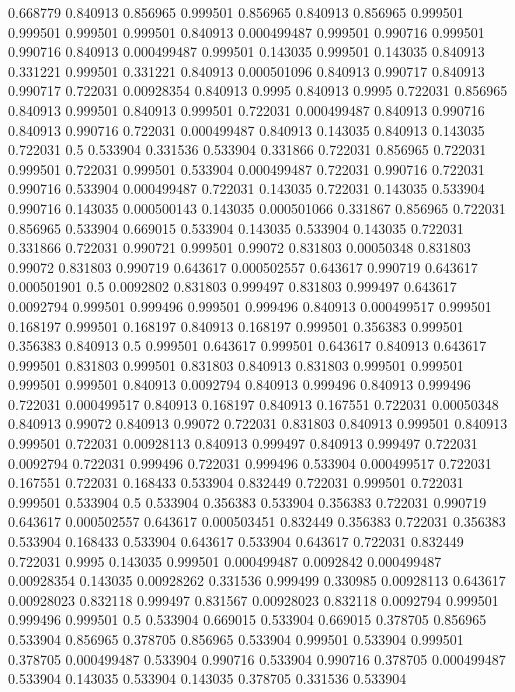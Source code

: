 0.668779 0.840913
0.856965 0.999501
0.856965 0.840913
0.856965 0.999501
0.999501 0.999501
0.999501 0.840913
0.000499487 0.999501
0.990716 0.999501
0.990716 0.840913
0.000499487 0.999501
0.143035 0.999501
0.143035 0.840913
0.331221 0.999501
0.331221 0.840913
0.000501096 0.840913
0.990717 0.840913
0.990717 0.722031
0.00928354 0.840913
0.9995 0.840913
0.9995 0.722031
0.856965 0.840913
0.999501 0.840913
0.999501 0.722031
0.000499487 0.840913
0.990716 0.840913
0.990716 0.722031
0.000499487 0.840913
0.143035 0.840913
0.143035 0.722031
0.5 0.533904
0.331536 0.533904
0.331866 0.722031
0.856965 0.722031
0.999501 0.722031
0.999501 0.533904
0.000499487 0.722031
0.990716 0.722031
0.990716 0.533904
0.000499487 0.722031
0.143035 0.722031
0.143035 0.533904
0.990716 0.143035
0.000500143 0.143035
0.000501066 0.331867
0.856965 0.722031
0.856965 0.533904
0.669015 0.533904
0.143035 0.533904
0.143035 0.722031
0.331866 0.722031
0.990721 0.999501
0.99072 0.831803
0.00050348 0.831803
0.99072 0.831803
0.990719 0.643617
0.000502557 0.643617
0.990719 0.643617
0.000501901 0.5
0.0092802 0.831803
0.999497 0.831803
0.999497 0.643617
0.0092794 0.999501
0.999496 0.999501
0.999496 0.840913
0.000499517 0.999501
0.168197 0.999501
0.168197 0.840913
0.168197 0.999501
0.356383 0.999501
0.356383 0.840913
0.5 0.999501
0.643617 0.999501
0.643617 0.840913
0.643617 0.999501
0.831803 0.999501
0.831803 0.840913
0.831803 0.999501
0.999501 0.999501
0.999501 0.840913
0.0092794 0.840913
0.999496 0.840913
0.999496 0.722031
0.000499517 0.840913
0.168197 0.840913
0.167551 0.722031
0.00050348 0.840913
0.99072 0.840913
0.99072 0.722031
0.831803 0.840913
0.999501 0.840913
0.999501 0.722031
0.00928113 0.840913
0.999497 0.840913
0.999497 0.722031
0.0092794 0.722031
0.999496 0.722031
0.999496 0.533904
0.000499517 0.722031
0.167551 0.722031
0.168433 0.533904
0.832449 0.722031
0.999501 0.722031
0.999501 0.533904
0.5 0.533904
0.356383 0.533904
0.356383 0.722031
0.990719 0.643617
0.000502557 0.643617
0.000503451 0.832449
0.356383 0.722031
0.356383 0.533904
0.168433 0.533904
0.643617 0.533904
0.643617 0.722031
0.832449 0.722031
0.9995 0.143035
0.999501 0.000499487
0.0092842 0.000499487
0.00928354 0.143035
0.00928262 0.331536
0.999499 0.330985
0.00928113 0.643617
0.00928023 0.832118
0.999497 0.831567
0.00928023 0.832118
0.0092794 0.999501
0.999496 0.999501
0.5 0.533904
0.669015 0.533904
0.669015 0.378705
0.856965 0.533904
0.856965 0.378705
0.856965 0.533904
0.999501 0.533904
0.999501 0.378705
0.000499487 0.533904
0.990716 0.533904
0.990716 0.378705
0.000499487 0.533904
0.143035 0.533904
0.143035 0.378705
0.331536 0.533904
